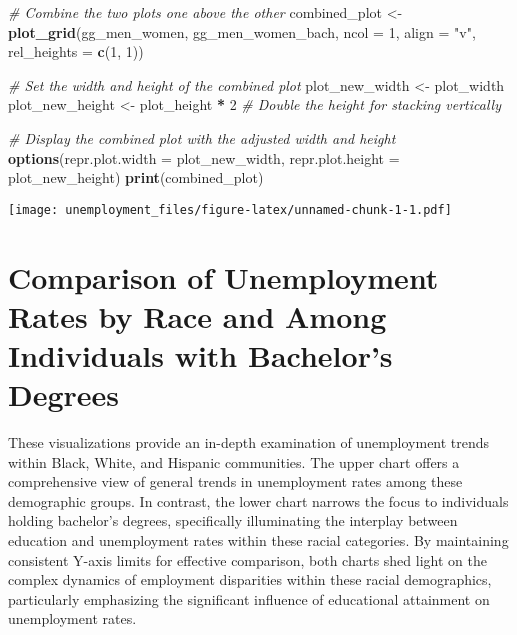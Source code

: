 \documentclass[
]{article}
\newenvironment{Shaded}{\begin{snugshade}}{\end{snugshade}}
\newcommand{\AttributeTok}[1]{\textcolor[rgb]{0.13,0.29,0.53}{#1}}
\newcommand{\CommentTok}[1]{\textcolor[rgb]{0.56,0.35,0.01}{\textit{#1}}}
\newcommand{\DecValTok}[1]{\textcolor[rgb]{0.00,0.00,0.81}{#1}}
\newcommand{\FunctionTok}[1]{\textcolor[rgb]{0.13,0.29,0.53}{\textbf{#1}}}
\newcommand{\NormalTok}[1]{#1}
\newcommand{\OtherTok}[1]{\textcolor[rgb]{0.56,0.35,0.01}{#1}}
\newcommand{\SpecialCharTok}[1]{\textcolor[rgb]{0.81,0.36,0.00}{\textbf{#1}}}
\newcommand{\StringTok}[1]{\textcolor[rgb]{0.31,0.60,0.02}{#1}}
\begin{document}
\begin{Shaded}
\begin{Highlighting}[]
\CommentTok{\# Combine the two plots one above the other}
\NormalTok{combined\_plot }\OtherTok{\textless{}{-}} \FunctionTok{plot\_grid}\NormalTok{(gg\_men\_women, gg\_men\_women\_bach, }\AttributeTok{ncol =} \DecValTok{1}\NormalTok{, }\AttributeTok{align =} \StringTok{"v"}\NormalTok{, }\AttributeTok{rel\_heights =} \FunctionTok{c}\NormalTok{(}\DecValTok{1}\NormalTok{, }\DecValTok{1}\NormalTok{))}

\CommentTok{\# Set the width and height of the combined plot}
\NormalTok{plot\_new\_width }\OtherTok{\textless{}{-}}\NormalTok{ plot\_width}
\NormalTok{plot\_new\_height }\OtherTok{\textless{}{-}}\NormalTok{ plot\_height }\SpecialCharTok{*} \DecValTok{2}  \CommentTok{\# Double the height for stacking vertically}

\CommentTok{\# Display the combined plot with the adjusted width and height}
\FunctionTok{options}\NormalTok{(}\AttributeTok{repr.plot.width =}\NormalTok{ plot\_new\_width, }\AttributeTok{repr.plot.height =}\NormalTok{ plot\_new\_height)}
\FunctionTok{print}\NormalTok{(combined\_plot)}
\end{Highlighting}
\end{Shaded}

\texttt{[image: unemployment\_files/figure-latex/unnamed-chunk-1-1.pdf]}

\hypertarget{comparison-of-unemployment-rates-by-race-and-among-individuals-with-bachelors-degrees}{%
\section{Comparison of Unemployment Rates by Race and Among Individuals
with Bachelor's
Degrees}\label{comparison-of-unemployment-rates-by-race-and-among-individuals-with-bachelors-degrees}}

These visualizations provide an in-depth examination of unemployment
trends within Black, White, and Hispanic communities. The upper chart
offers a comprehensive view of general trends in unemployment rates
among these demographic groups. In contrast, the lower chart narrows the
focus to individuals holding bachelor's degrees, specifically
illuminating the interplay between education and unemployment rates
within these racial categories. By maintaining consistent Y-axis limits
for effective comparison, both charts shed light on the complex dynamics
of employment disparities within these racial demographics, particularly
emphasizing the significant influence of educational attainment on
unemployment rates.
\end{document}

